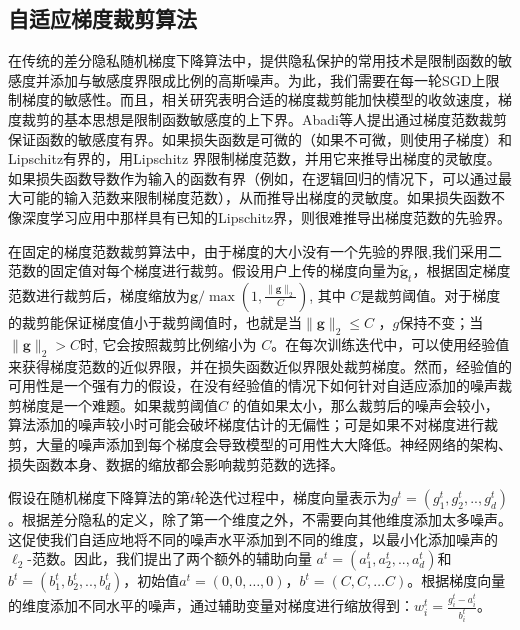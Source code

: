 \subsection{自适应梯度裁剪算法}
在传统的差分隐私随机梯度下降算法中，提供隐私保护的常用技术是限制函数的敏感度并添加与敏感度界限成比例的高斯噪声。为此，我们需要在每一轮SGD上限制梯度的敏感性。而且，相关研究表明合适的梯度裁剪能加快模型的收敛速度，梯度裁剪的基本思想是限制函数敏感度的上下界。Abadi等人提出通过梯度范数裁剪保证函数的敏感度有界。如果损失函数是可微的（如果不可微，则使用子梯度）和Lipschitz有界的，用Lipschitz 界限制梯度范数，并用它来推导出梯度的灵敏度。 如果损失函数导数作为输入的函数有界（例如，在逻辑回归的情况下，可以通过最大可能的输入范数来限制梯度范数），从而推导出梯度的灵敏度。如果损失函数不像深度学习应用中那样具有已知的Lipschitz界，则很难推导出梯度范数的先验界。

在固定的梯度范数裁剪算法中，由于梯度的大小没有一个先验的界限,我们采用二范数的固定值对每个梯度进行裁剪。假设用户上传的梯度向量为$\tilde{\mathbf{g}}_{t}$，根据固定梯度范数进行裁剪后，梯度缩放为$\mathbf{g} / \max \left(1, \frac{\|\mathbf{g}\|_{2}}{C}\right)$, 其中 $C$是裁剪阈值。对于梯度的裁剪能保证梯度值小于裁剪阈值时，也就是当$\|\mathbf{g}\|_{2} \leq C$ ，$g$保持不变；当$\|\mathbf{g}\|_{2}>C$时, 它会按照裁剪比例缩小为 $C$。在每次训练迭代中，可以使用经验值来获得梯度范数的近似界限，并在损失函数近似界限处裁剪梯度。然而，经验值的可用性是一个强有力的假设，在没有经验值的情况下如何针对自适应添加的噪声裁剪梯度是一个难题。如果裁剪阈值$C$ 的值如果太小，那么裁剪后的噪声会较小，算法添加的噪声较小时可能会破坏梯度估计的无偏性；可是如果不对梯度进行裁剪，大量的噪声添加到每个梯度会导致模型的可用性大大降低。神经网络的架构、损失函数本身、数据的缩放都会影响裁剪范数的选择。

假设在随机梯度下降算法的第$t$轮迭代过程中，梯度向量表示为$g^{t}=\left(g_{1}^{t}, g_{2}^{t}, . ., g_{d}^{t}\right)$。根据差分隐私的定义，除了第一个维度之外，不需要向其他维度添加太多噪声。这促使我们自适应地将不同的噪声水平添加到不同的维度，以最小化添加噪声的 $\ell_{2}$-范数。因此，我们提出了两个额外的辅助向量 $a^{t}=\left(a_{1}^{t}, a_{2}^{t}, . ., a_{d}^{t}\right)$和$b^{t}=\left(b_{1}^{t}, b_{2}^{t}, . ., b_{d}^{t}\right)$，初始值$a^{t}=(0,0, \ldots, 0)$，$b^{t}=(C, C, \ldots C)$。根据梯度向量的维度添加不同水平的噪声，通过辅助变量对梯度进行缩放得到：$w_{i}^{t}=\frac{g_{i}^{t}-a_{i}^{t}}{b_{i}^{t}}$。

